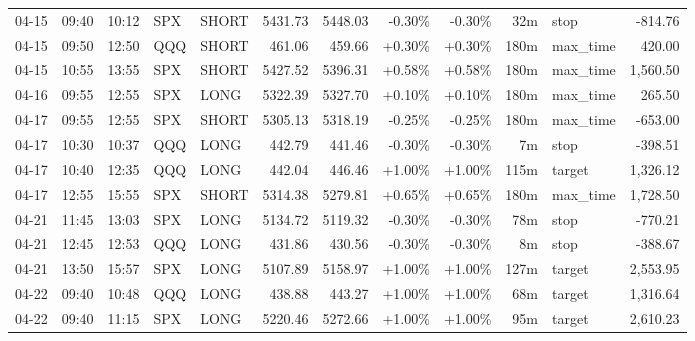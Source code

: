 \documentclass[11pt,a4paper]{article}
\begin{document}
\begin{center}
\begin{longtable}{>{\color{txtmain}}l l l l l r r r r r >{\color{txtmain}}l r}
04-15 & 09:40 & 10:12 & SPX & SHORT & 5431.73 & 5448.03 & \textcolor{lossred}{-0.30\%} & \textcolor{lossred}{-0.30\%} & 32m & stop & \textcolor{lossred}{-814.76} \\
04-15 & 09:50 & 12:50 & QQQ & SHORT & 461.06 & 459.66 & \textcolor{wingreen}{+0.30\%} & \textcolor{wingreen}{+0.30\%} & 180m & max\_time & \textcolor{wingreen}{420.00} \\
04-15 & 10:55 & 13:55 & SPX & SHORT & 5427.52 & 5396.31 & \textcolor{wingreen}{+0.58\%} & \textcolor{wingreen}{+0.58\%} & 180m & max\_time & \textcolor{wingreen}{1,560.50} \\
04-16 & 09:55 & 12:55 & SPX & LONG & 5322.39 & 5327.70 & \textcolor{wingreen}{+0.10\%} & \textcolor{wingreen}{+0.10\%} & 180m & max\_time & \textcolor{wingreen}{265.50} \\
04-17 & 09:55 & 12:55 & SPX & SHORT & 5305.13 & 5318.19 & \textcolor{lossred}{-0.25\%} & \textcolor{lossred}{-0.25\%} & 180m & max\_time & \textcolor{lossred}{-653.00} \\
04-17 & 10:30 & 10:37 & QQQ & LONG & 442.79 & 441.46 & \textcolor{lossred}{-0.30\%} & \textcolor{lossred}{-0.30\%} & 7m & stop & \textcolor{lossred}{-398.51} \\
04-17 & 10:40 & 12:35 & QQQ & LONG & 442.04 & 446.46 & \textcolor{wingreen}{+1.00\%} & \textcolor{wingreen}{+1.00\%} & 115m & target & \textcolor{wingreen}{1,326.12} \\
04-17 & 12:55 & 15:55 & SPX & SHORT & 5314.38 & 5279.81 & \textcolor{wingreen}{+0.65\%} & \textcolor{wingreen}{+0.65\%} & 180m & max\_time & \textcolor{wingreen}{1,728.50} \\
04-21 & 11:45 & 13:03 & SPX & LONG & 5134.72 & 5119.32 & \textcolor{lossred}{-0.30\%} & \textcolor{lossred}{-0.30\%} & 78m & stop & \textcolor{lossred}{-770.21} \\
04-21 & 12:45 & 12:53 & QQQ & LONG & 431.86 & 430.56 & \textcolor{lossred}{-0.30\%} & \textcolor{lossred}{-0.30\%} & 8m & stop & \textcolor{lossred}{-388.67} \\
04-21 & 13:50 & 15:57 & SPX & LONG & 5107.89 & 5158.97 & \textcolor{wingreen}{+1.00\%} & \textcolor{wingreen}{+1.00\%} & 127m & target & \textcolor{wingreen}{2,553.95} \\
04-22 & 09:40 & 10:48 & QQQ & LONG & 438.88 & 443.27 & \textcolor{wingreen}{+1.00\%} & \textcolor{wingreen}{+1.00\%} & 68m & target & \textcolor{wingreen}{1,316.64} \\
04-22 & 09:40 & 11:15 & SPX & LONG & 5220.46 & 5272.66 & \textcolor{wingreen}{+1.00\%} & \textcolor{wingreen}{+1.00\%} & 95m & target & \textcolor{wingreen}{2,610.23} \\

\end{longtable}
\end{center}
\end{document}
